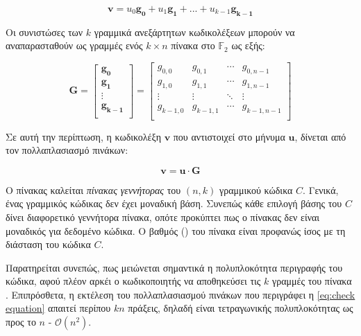 \begin{equation}
\mathbf{v}=u_0\mathbf{g_0}+u_1\mathbf{g_1}+...+u_{k-1}\mathbf{g_{k-1}}
\label{eq:codeword formation}
\end{equation}

Οι συνιστώσες των $k$ γραμμικά ανεξάρτητων κωδικολέξεων μπορούν να αναπαρασταθούν ως γραμμές ενός $k\times n$ πίνακα στο $\mathbb{F}_2$ ως εξής:

\begin{equation}
\mathbf{G}=\begin{bmatrix}\mathbf{g_0}\\\mathbf{g_1}\\\vdots\\\mathbf{g_{k-1}}\\\end{bmatrix}=\begin{bmatrix}g_{0,0} & g_{0,1} & \cdots & g_{0,n-1}\\g_{1,0} & g_{1,1} & \cdots & g_{1,n-1}\\\vdots & \vdots & \ddots & \vdots\\g_{k-1,0} & g_{k-1,1} & \cdots & g_{k-1,n-1}\\\end{bmatrix}
\label{eq:generator matrix}
\end{equation}

Σε αυτή την περίπτωση, η κωδικολέξη $\mathbf{v}$ που αντιστοιχεί στο μήνυμα $\mathbf{u}$, δίνεται από τον πολλαπλασιασμό πινάκων: 

\begin{equation}
\mathbf{v=u \cdot G}
\label{eq:check equation}
\end{equation}

Ο πίνακας  καλείται \textit{πίνακας γεννήτορας}  του $(n,k)$ γραμμικού  κώδικα $C$. Γενικά, ένας γραμμικός  κώδικας δεν έχει μοναδική βάση. Συνεπώς κάθε επιλογή βάσης του $C$ δίνει διαφορετικό γεννήτορα πίνακα, οπότε προκύπτει πως ο πίνακας  δεν είναι μοναδικός για δεδομένο κώδικα. Ο βαθμός () του πίνακα  είναι προφανώς ίσος με τη διάσταση του κώδικα $C$.

Παρατηρείται συνεπώς, πως μειώνεται σημαντικά η πολυπλοκότητα περιγραφής του κώδικα, αφού πλέον αρκέι ο κωδικοποιητής να αποθηκεύσει τις $k$ γραμμές του πίνακα . Επιπρόσθετα, η εκτέλεση του πολλαπλασιασμού πινάκων που περιγράφει η \ref{eq:check equation} απαιτεί περίπου $kn$ πράξεις, δηλαδή είναι τετραγωνικής πολυπλοκότητας ως προς το $n$ - $\mathcal{O}(n^2)$.

